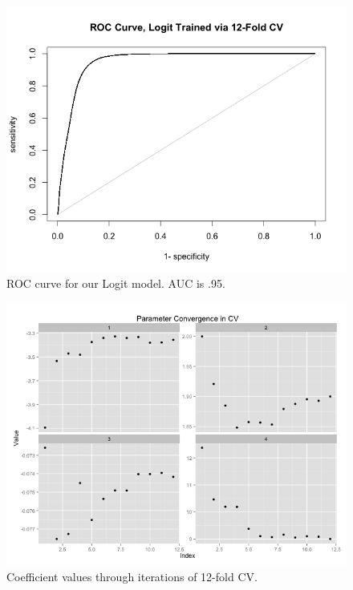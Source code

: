 \documentclass{article}\usepackage[]{graphicx}\usepackage[]{color}
\begin{document}
\begin{figure}[H]
\begin{center}
\includegraphics[scale = .5]{LogitROC.png}
\caption{ROC curve for our Logit model. AUC is .95.}
\end{center}
\end{figure}

\begin{figure}[H]
\begin{center}
\includegraphics[scale = .5]{ParameterConvergence.png}
\caption{Coefficient values through iterations of 12-fold CV.}
\end{center}
\end{figure}
\end{document}
